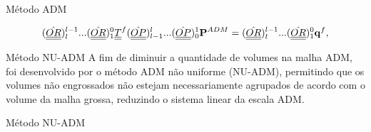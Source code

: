 \documentclass[professionalfont]{beamer}
\begin{document}
\begin{frame}{Método ADM}
    \begin{figure}
        \caption{Representação dos conjuntos $\Omega^{l}$, $\Pi^{l}$ e $\Gamma^{l}$}
        \begin{subfigure}{.3\textwidth}
            \centering
            \resizebox*{3cm}{!}{
            }
            \label{fig:multinivel.2.a}
        \end{subfigure}
        \begin{subfigure}{.3\textwidth}
            \centering
            \resizebox*{3cm}{!}{
            }
            \label{fig:multinivel.2.b}
        \end{subfigure}
        \begin{subfigure}{.3\textwidth}
            \centering
            \resizebox*{3cm}{!}{
            }
            \label{fig:multinivel.2.c}
        \end{subfigure}
        \label{fig:multinivel.2}
    \end{figure}

    \begin{equation}
        \label{eq:multinivel.3}
        ( \hat{\underline{\underline{OR}}} )^{l-1}_{l} ... ( \hat{\underline{\underline{OR}}} )^{0}_{1} \underline{\underline{T}}^{f} (\hat{\underline{\underline{OP}}})^{l}_{l-1} ... (\hat{\underline{\underline{OP}}})^{1}_{0} \bold{P}^{ADM} = ( \hat{\underline{\underline{OR}}} )^{l-1}_{l} ... ( \hat{\underline{\underline{OR}}} )^{0}_{1} \mathbf{q}^{f},
    \end{equation}
\end{frame}

\begin{frame}{Método NU-ADM}
    A fim de diminuir a quantidade de volumes na malha ADM, foi desenvolvido por  o método ADM não uniforme (NU-ADM), permitindo que os volumes não engrossados não estejam necessariamente agrupados de acordo com o volume da malha grossa, reduzindo o sistema linear da escala ADM.


\end{frame}

\begin{frame}{Método NU-ADM}
    \begin{figure}
        \caption{Diferença entre os métodos ADM e NU-ADM}
        \begin{subfigure}{.48\textwidth}
            \centering
            \resizebox*{5cm}{!}{
            }
            \label{fig:multinivel.3.a}
        \end{subfigure}
        \begin{subfigure}{.48\textwidth}
            \centering
            \resizebox*{5cm}{!}{
            }
            \label{fig:multinivel.3.b}
        \end{subfigure}
        \label{fig:multinivel.2}
    \end{figure}

\end{frame}
\end{document}
